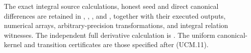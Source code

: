 The exact integral source calculations, honest seed and direct
canonical differences are retained in
,
,
, and
, together with their executed
outputs, numerical arrays, arbitrary-precision transformations,
and integral relation witnesses.
The independent full derivative calculation is
.
The uniform canonical-kernel and transition certificates are those
specified after (UCM.11).
